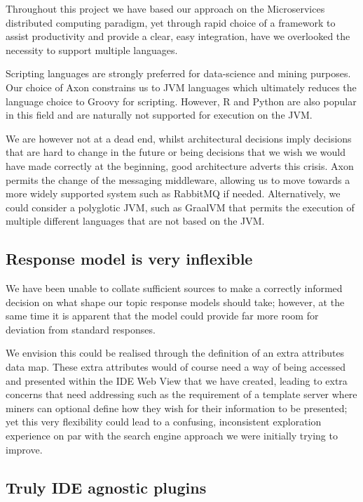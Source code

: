 Throughout this project we have based our approach on the Microservices distributed computing paradigm, yet through rapid choice of a framework to assist productivity and provide a clear, easy integration, have we overlooked the necessity to support multiple languages.

Scripting languages are strongly preferred for data-science and mining purposes. Our choice of Axon constrains us to JVM languages which ultimately reduces the language choice to Groovy for scripting. However, R and Python are also popular in this field and are naturally not supported for execution on the JVM. 

We are however not at a dead end, whilst architectural decisions imply decisions that are hard to change in the future or being decisions that we wish we would have made correctly at the beginning, good architecture adverts this crisis. Axon permits the change of the messaging middleware, allowing us to move towards a more widely supported system such as RabbitMQ if needed. Alternatively, we could consider a polyglotic JVM, such as GraalVM \parencite{graalVM} that permits the execution of multiple different languages that are not based on the JVM.

\subsection{Response model is very inflexible}

We have been unable to collate sufficient sources to make a correctly informed decision on what shape our topic response models should take; however, at the same time it is apparent that the model could provide far more room for deviation from standard responses. 

We envision this could be realised through the definition of an extra attributes data map. These extra attributes would of course need a way of being accessed and presented within the IDE Web View that we have created, leading to extra concerns that need addressing such as the requirement of a template server where miners can optional define how they wish for their information to be presented; yet this very flexibility could lead to a confusing, inconsistent exploration experience on par with the search engine approach we were initially trying to improve.

\subsection{Truly IDE agnostic plugins}

